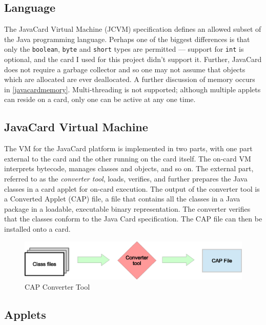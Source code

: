 \documentclass[12pt,a4paper,twoside,openright]{report}
\begin{document}
\subsection{Language}

The JavaCard Virtual Machine (JCVM) specification defines an allowed subset of the Java programming language. Perhaps one of the biggest differences is that only the \texttt{boolean}, \texttt{byte} and \texttt{short} types are permitted --- support for \texttt{int} is optional, and the card I used for this project didn't support it. Further, JavaCard does not require a garbage collector and so one may not assume that objects which are allocated are ever deallocated. A further discussion of memory occurs in \autoref{javacardmemory}. Multi-threading is not supported; although multiple applets can reside on a card, only one can be active at any one time.

\subsection{JavaCard Virtual Machine}

The VM for the JavaCard platform is implemented in two parts, with one part external to the card and the other running on the card itself. The on-card VM interprets bytecode, manages classes and objects, and so on. The external part, referred to as the \emph{converter tool}, loads, verifies, and further prepares the Java classes in a card applet for on-card execution. The output of the converter tool is a Converted Applet (CAP) file, a file that contains all the classes in a Java package in a loadable, executable binary representation. The converter verifies that the classes conform to the Java Card specification. The CAP file can then be installed onto a card.

\begin{figure}[tbh]
\centerline{\includegraphics{figures/capconverter.eps}}
\caption{CAP Converter Tool}
\label{capconverter}
\end{figure}

\subsection{Applets}
\end{document}
